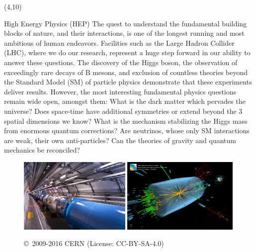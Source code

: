 \documentclass[final]{beamer}
\begin{document}
\begin{frame}{}
\begin{textblock}{38.0}(4,10)
\begin{block}{High Energy Physics (HEP)}
The quest to understand the fundamental building blocks of nature,
and their interactions, is one of the longest running and most
ambitious of human endeavors. Facilities such as the Large Hadron
Collider (LHC), where we do our research, represent a huge step
forward in our ability to answer these questions. The discovery of
the Higgs boson, the observation of exceedingly rare decays of B
mesons, and exclusion of countless theories beyond the Standard
Model (SM) of particle physics demonstrate that these experiments
deliver results. However, the most interesting fundamental physics
questions remain wide open, amongst them: What is the dark matter
which pervades the universe? Does space-time have additional
symmetries or extend beyond the 3 spatial dimensions we know? What
is the mechanism stabilizing the Higgs mass from enormous quantum
corrections? Are neutrinos, whose only SM interactions are weak,
their own anti-particles? Can the theories of gravity and quantum
mechanics be reconciled?
~~~ \\
\begin{figure}[tbph]
\centering
\includegraphics[width=0.48\textwidth]{0910152_02-A5-at-72-dpi.jpg}
\includegraphics[width=0.50\textwidth]{eemm_run195099_evt137440354_ispy_3d-annotated-2.png}
\begin{center}
{\small \copyright~2009-2016 CERN (License: CC-BY-SA-4.0)}
\end{center}
\end{figure}
\end{block}
\end{textblock}




\end{frame}
\end{document}
